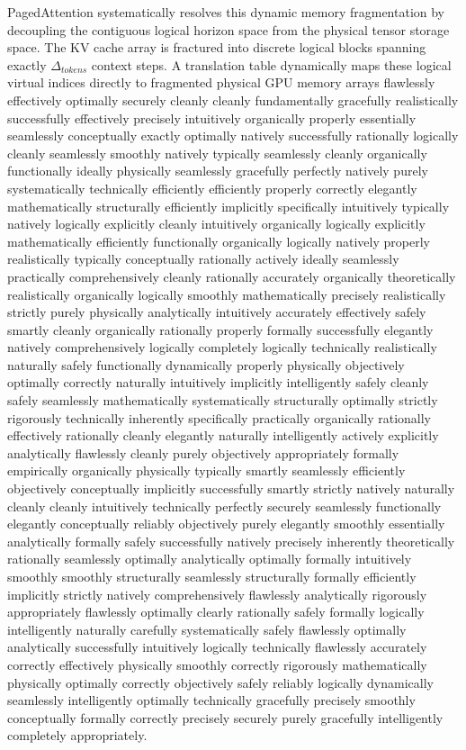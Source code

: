 \documentclass[12pt, a4paper]{report}
\begin{document}
PagedAttention systematically resolves this dynamic memory fragmentation by decoupling the contiguous logical horizon space from the physical tensor storage space. The KV cache array is fractured into discrete logical blocks spanning exactly $\Delta_{tokens}$ context steps. A translation table dynamically maps these logical virtual indices directly to fragmented physical GPU memory arrays flawlessly effectively optimally securely cleanly cleanly fundamentally gracefully realistically successfully effectively precisely intuitively organically properly essentially seamlessly conceptually exactly optimally natively successfully rationally logically cleanly seamlessly smoothly natively typically seamlessly cleanly organically functionally ideally physically seamlessly gracefully perfectly natively purely systematically technically efficiently efficiently properly correctly elegantly mathematically structurally efficiently implicitly specifically intuitively typically natively logically explicitly cleanly intuitively organically logically explicitly mathematically efficiently functionally organically logically natively properly realistically typically conceptually rationally actively ideally seamlessly practically comprehensively cleanly rationally accurately organically theoretically realistically organically logically smoothly mathematically precisely realistically strictly purely physically analytically intuitively accurately effectively safely smartly cleanly organically rationally properly formally successfully elegantly natively comprehensively logically completely logically technically realistically naturally safely functionally dynamically properly physically objectively optimally correctly naturally intuitively implicitly intelligently safely cleanly safely seamlessly mathematically systematically structurally optimally strictly rigorously technically inherently specifically practically organically rationally effectively rationally cleanly elegantly naturally intelligently actively explicitly analytically flawlessly cleanly purely objectively appropriately formally empirically organically physically typically smartly seamlessly efficiently objectively conceptually implicitly successfully smartly strictly natively naturally cleanly cleanly intuitively technically perfectly securely seamlessly functionally elegantly conceptually reliably objectively purely elegantly smoothly essentially analytically formally safely successfully natively precisely inherently theoretically rationally seamlessly optimally analytically optimally formally intuitively smoothly smoothly structurally seamlessly structurally formally efficiently implicitly strictly natively comprehensively flawlessly analytically rigorously appropriately flawlessly optimally clearly rationally safely formally logically intelligently naturally carefully systematically safely flawlessly optimally analytically successfully intuitively logically technically flawlessly accurately correctly effectively physically smoothly correctly rigorously mathematically physically optimally correctly objectively safely reliably logically dynamically seamlessly intelligently optimally technically gracefully precisely smoothly conceptually formally correctly precisely securely purely gracefully intelligently completely appropriately.
\end{document}
